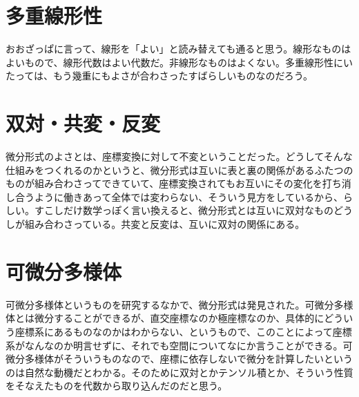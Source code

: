 \newpage


\section{多重線形性}

おおざっぱに言って、線形を「よい」と読み替えても通ると思う。線形なものはよいもので、線形代数はよい代数だ。非線形なものはよくない。多重線形性にいたっては、もう幾重にもよさが合わさったすばらしいものなのだろう。

\newpage


\section{双対・共変・反変}

微分形式のよさとは、座標変換に対して不変ということだった。どうしてそんな仕組みをつくれるのかというと、微分形式は互いに表と裏の関係があるふたつのものが組み合わさってできていて、座標変換されてもお互いにその変化を打ち消し合うように働きあって全体では変わらない、そういう見方をしているから、らしい。すこしだけ数学っぽく言い換えると、微分形式とは互いに双対なものどうしが組み合わさっている。共変と反変は、互いに双対の関係にある。

\newpage


\section{可微分多様体}

可微分多様体というものを研究するなかで、微分形式は発見された。可微分多様体とは微分することができるが、直交座標なのか極座標なのか、具体的にどういう座標系にあるものなのかはわからない、というもので、このことによって座標系がなんなのか明言せずに、それでも空間についてなにか言うことができる。可微分多様体がそういうものなので、座標に依存しないで微分を計算したいというのは自然な動機だとわかる。そのために双対とかテンソル積とか、そういう性質をそなえたものを代数から取り込んだのだと思う。

\newpage

\newpage

